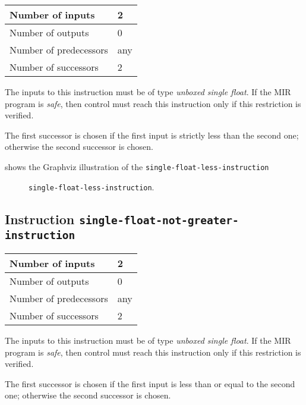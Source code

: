 \begin{tabular}{|l|l|}
\hline
Number of inputs & 2\\
\hline
Number of outputs & 0\\
\hline
Number of predecessors & any\\
\hline
Number of successors & 2\\
\hline
\end{tabular}

The inputs to this instruction must be of type \emph{unboxed single
  float}.  If the MIR program is \emph{safe}, then control must reach
this instruction only if this restriction is verified.

The first successor is chosen if the first input is strictly less than
the second one; otherwise the second successor is chosen. 

 shows the Graphviz illustration of the
\texttt{single-float-less-instruction}

\begin{figure}
\begin{center}
\end{center}
\caption{\label{fig-single-float-less-instruction}
\texttt{single-float-less-instruction}.}
\end{figure}

\subsection{Instruction \texttt{single-float-not-greater-instruction}}
\label{mir-instruction-single-float-not-greater}

\begin{tabular}{|l|l|}
\hline
Number of inputs & 2\\
\hline
Number of outputs & 0\\
\hline
Number of predecessors & any\\
\hline
Number of successors & 2\\
\hline
\end{tabular}

The inputs to this instruction must be of type \emph{unboxed single
  float}.  If the MIR program is \emph{safe}, then control must reach
this instruction only if this restriction is verified.

The first successor is chosen if the first input is less than or equal
to the second one; otherwise the second successor is chosen.


